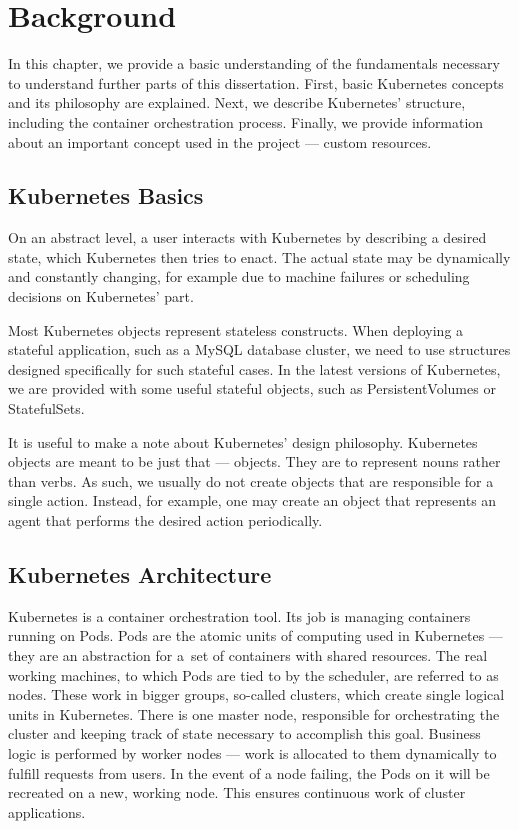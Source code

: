 \chapter{Background}

In this chapter, we provide a basic understanding of the fundamentals necessary to understand
further parts of this dissertation. First, basic Kubernetes concepts and its philosophy are
explained. Next, we describe Kubernetes' structure, including the container orchestration process.
Finally, we provide information about an important concept used in the project --- custom resources.

\section{Kubernetes Basics}
On an abstract level, a user interacts with Kubernetes by describing a desired state, which
Kubernetes then tries to enact. The actual state may be dynamically and constantly changing, for
example due to machine failures or scheduling decisions on Kubernetes' part.

Most Kubernetes objects represent stateless constructs. When deploying a stateful application, such as a
MySQL database cluster, we need to use structures designed specifically for such stateful cases. In
the latest versions of Kubernetes, we are provided with some useful stateful objects, such as
PersistentVolumes or StatefulSets.

It is useful to make a note about Kubernetes' design philosophy.
Kubernetes objects are meant to be just that --- objects. They are to represent nouns rather than
verbs. As such, we usually do not create objects that are responsible for a single action. Instead,
for example, one may create an object that represents an agent that performs the desired action
periodically.

\section{Kubernetes Architecture}

Kubernetes is a container orchestration tool. Its job is managing containers running on Pods. Pods
are the atomic units of computing used in Kubernetes --- they are an abstraction for a~set of
containers with shared resources. The real working machines, to which Pods are tied to by the
scheduler, are referred to as nodes. These work in bigger groups, so-called clusters, which
create single logical units in Kubernetes. There is one master node, responsible for orchestrating
the cluster and keeping track of state necessary to accomplish this goal. Business logic is
performed by worker nodes --- work is allocated to them dynamically to fulfill requests from users.
In the event of a node failing, the Pods on it will be recreated on a new,
working node. This ensures continuous work of cluster applications.

